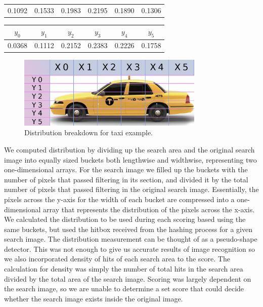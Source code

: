 \documentclass[10pt, journal]{vgtc}                %
\newcommand\tab[1][1cm]{\hspace*{#1}}
\begin{document}
\begin{flushleft}
\begin{table}[h!]
\begin{center}
\begin{tabular}{cccccc}
			0.1092 &  0.1533 & 0.1983 & 0.2195 & 0.1890 & 0.1306 \\
		\end{tabular}
	\end{center}
	\begin{center}
		\begin{tabular}{cccccc}
			$y_0$ & $y_1$ & $y_2$ & $y_3$ & $y_4$  & $y_5$\\
			\hline
			0.0368 &  0.1112 & 0.2152 & 0.2383 & 0.2226 & 0.1758 \\
		\end{tabular}
\end{center}
\end{table}
\begin{figure}[h!]
\centering
\includegraphics[width=3.5in]{distribution.png}
\caption{Distribution breakdown for taxi example.}
\end{figure}
\tab We computed distribution by dividing up the search area and the original search image into equally sized buckets both lengthwise and widthwise, representing two one-dimensional arrays. For the search image we filled up the buckets with the number of pixels that passed filtering in its section, and divided it by the total number of pixels that passed filtering in the original search image. Essentially, the pixels across the y-axis for the width of each bucket are compressed into a one-dimensional array that represents the distribution of the pixels across the x-axis. We calculated the distribution to be used during each scoring based using the same buckets, but used the hitbox received from the hashing process for a given search image. The distribution measurement can be thought of as a pseudo-shape detector. This was not enough to give us accurate results of image recognition so we also incorporated density of hits of each search area to the score. The calculation for density was simply the number of total hits in the search area divided by the total area of the search image. Scoring was largely dependent on the search image, so we are unable to determine a set score that could decide whether the search image exists inside the original image.

\end{flushleft}
\end{document}
